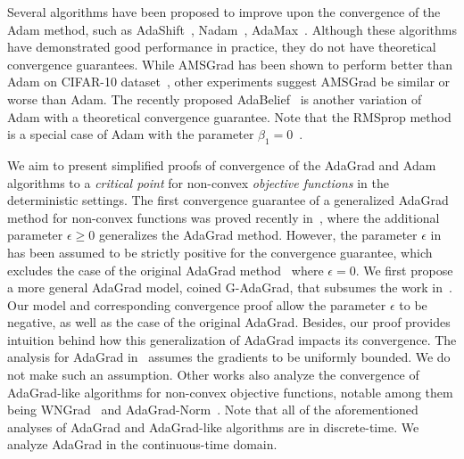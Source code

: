 Several algorithms have been proposed to improve upon the convergence of the Adam method, such as AdaShift~\cite{zhou2018adashift}, Nadam~\cite{dozat2016incorporating}, AdaMax~\cite{kingma2014adam}. Although these algorithms have demonstrated good performance in practice, they do not have theoretical convergence guarantees. While AMSGrad has been shown to perform better than Adam on CIFAR-10 dataset~\cite{reddi2019convergence}, other experiments suggest AMSGrad be similar or worse than Adam. The recently proposed AdaBelief~\cite{zhuang2020adabelief} is another variation of Adam with a theoretical convergence guarantee. Note that the RMSprop method is a special case of Adam with the parameter $\beta_1=0$~\cite{reddi2018adaptive}.

We aim to present simplified proofs of convergence of the AdaGrad and Adam algorithms to a {\em critical point} for non-convex {\em objective functions} in the deterministic settings. The first convergence guarantee of a generalized AdaGrad method for non-convex functions was proved recently in~\cite{li2019convergence}, where the additional parameter $\epsilon \geq 0$ generalizes the AdaGrad method. However, the parameter $\epsilon$ in~\cite{li2019convergence} has been assumed to be strictly positive for the convergence guarantee, which excludes the case of the original AdaGrad method~\cite{duchi2011adaptive} where $\epsilon = 0$. We first propose a more general AdaGrad model, coined G-AdaGrad, that subsumes the work in~\cite{li2019convergence}.  Our model and corresponding convergence proof allow the parameter $\epsilon$ to be negative, as well as the case of the original AdaGrad. Besides, our proof provides intuition behind how this generalization of AdaGrad impacts its convergence. The analysis for AdaGrad in~\cite{defossez2020simple} assumes the gradients to be uniformly bounded. We do not make such an assumption. Other works also analyze the convergence of AdaGrad-like algorithms for non-convex objective functions, notable among them being WNGrad~\cite{wu2018wngrad} and AdaGrad-Norm~\cite{ward2019adagrad}. 
Note that all of the aforementioned analyses of AdaGrad and AdaGrad-like algorithms are in discrete-time. We analyze AdaGrad in the continuous-time domain.

